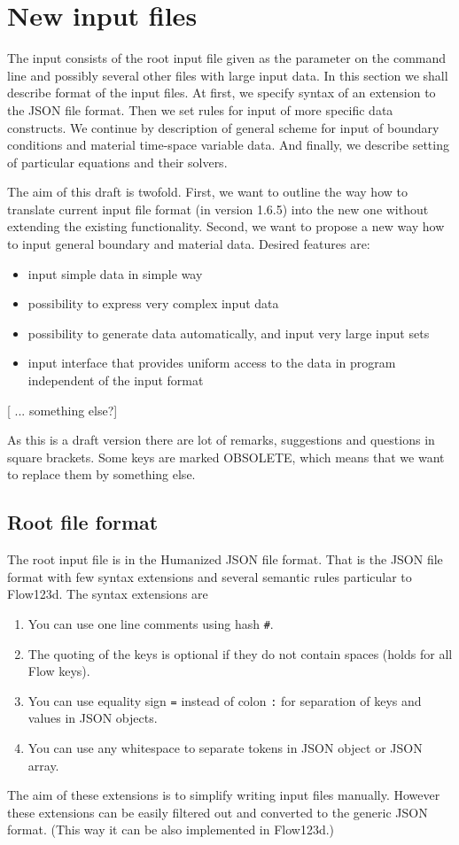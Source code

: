 

\chapter{New input files}
The input consists of the root input file given as the parameter on the command line and possibly several other 
files with large input data. In this section we shall describe format of the input files. At first, we specify syntax of
an extension to the JSON file format. Then we set rules for input of more specific data constructs. We continue by description of general scheme for input of
boundary conditions and material time-space variable data. And finally, we describe setting of particular equations and their solvers.

The aim of this draft is twofold. First, we want to outline the way how to translate current input file format (in version 1.6.5) into the new one without extending 
the existing functionality. Second, we want to propose a new way how to input general boundary and material data. Desired features are:
\begin{itemize}
 \item input simple data in simple way
 \item possibility to express very complex input data 
 \item possibility to generate data automatically, and input very large input sets
 \item input interface that provides uniform access to the data in program independent of the input format
\end{itemize}
[ ... something else?]

As this is a draft version there are lot of remarks, suggestions and questions in square brackets. Some keys are marked OBSOLETE, which means that 
we want to replace them by something else.

\section{Root file format}
The root input file is in the Humanized JSON file format. That is the JSON file format with few syntax extensions and several semantic rules particular to
Flow123d. The syntax extensions are
\begin{enumerate}
\item You can use one line comments using hash \verb'#'.
\item The quoting of the keys is optional if they do not contain spaces (holds for all Flow keys).
\item You can use equality sign \verb'=' instead of colon \verb':' for separation of keys and values in JSON objects.
\item You can use any whitespace to separate tokens in JSON object or JSON array.
\end{enumerate}
The aim of these extensions is to simplify writing input files manually. However these extensions can be easily filtered out and converted to 
the generic JSON format. (This way it can be also implemented in Flow123d.)

